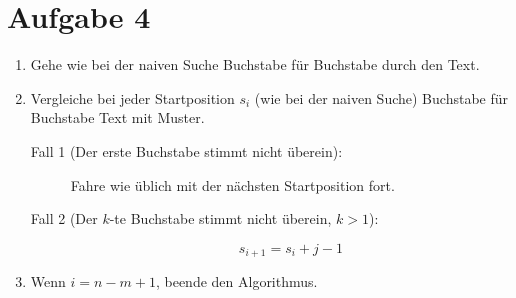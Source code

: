 \documentclass[a4paper, 11pt]{article}
\begin{document}
    \section*{Aufgabe 4}
    \begin{enumerate}
        \item Gehe wie bei der naiven Suche Buchstabe für Buchstabe durch den Text.
        \item Vergleiche bei jeder Startposition $s_i$ (wie bei der naiven Suche) Buchstabe für Buchstabe Text mit Muster.
        \begin{description}
            \item[Fall 1 (Der erste Buchstabe stimmt nicht überein):]
            Fahre wie üblich mit der nächsten Startposition fort.
            \item[Fall 2 (Der $k$-te Buchstabe stimmt nicht überein, $k > 1$):]
            \[
                s_{i + 1} = s_i + j - 1
            \]
        \end{description}
        \item Wenn $i = n - m + 1$, beende den Algorithmus.
    \end{enumerate}
\end{document}
